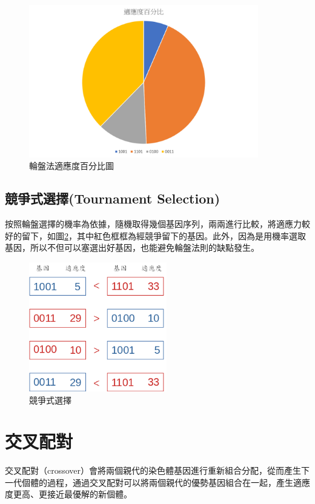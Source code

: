 \begin{figure}[H]
	\centerline{\includegraphics[width=10cm]{pic/wheelFitness.png}}
	\caption{輪盤法適應度百分比圖}
	\label{fig:WheelMethodPercentage}
\end{figure}


\subsection{競爭式選擇(Tournament Selection)}
按照輪盤選擇的機率為依據，隨機取得幾個基因序列，兩兩進行比較，將適應力較好的留下，如圖\ref{fig:TournamentSelection}，其中紅色框框為經競爭留下的基因。此外，因為是用機率選取基因，所以不但可以塞選出好基因，也能避免輪盤法則的缺點發生。

\begin{figure}[H]
	\centerline{\includegraphics[width=6cm]{./pic/us1jJ97T.png}}
	\caption{競爭式選擇}
	\label{fig:TournamentSelection}
\end{figure}

\newpage
\section{交叉配對}
交叉配對（crossover）會將兩個親代的染色體基因進行重新組合分配，從而產生下一代個體的過程，通過交叉配對可以將兩個親代的優勢基因組合在一起，產生適應度更高、更接近最優解的新個體。

